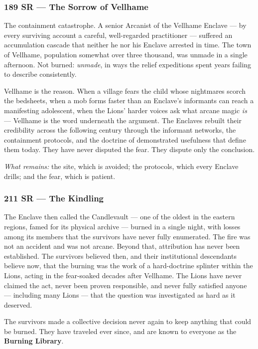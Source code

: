 \subsubsection{189 SR --- The Sorrow of Vellhame}

The containment catastrophe. A senior Arcanist of the Vellhame Enclave --- by every surviving account a careful, well-regarded practitioner --- suffered an accumulation cascade that neither he nor his Enclave arrested in time. The town of Vellhame, population somewhat over three thousand, was unmade in a single afternoon. Not burned: \textit{unmade}, in ways the relief expeditions spent years failing to describe consistently.

Vellhame is the reason. When a village fears the child whose nightmares scorch the bedsheets, when a mob forms faster than an Enclave's informants can reach a manifesting adolescent, when the Lions' harder voices ask what arcane magic \textit{is} --- Vellhame is the word underneath the argument. The Enclaves rebuilt their credibility across the following century through the informant networks, the containment protocols, and the doctrine of demonstrated usefulness that define them today. They have never disputed the fear. They dispute only the conclusion.

\textit{What remains:} the site, which is avoided; the protocols, which every Enclave drills; and the fear, which is patient.

\subsubsection{211 SR --- The Kindling}

The Enclave then called the Candlevault --- one of the oldest in the eastern regions, famed for its physical archive --- burned in a single night, with losses among its members that the survivors have never fully enumerated. The fire was not an accident and was not arcane. Beyond that, attribution has never been established. The survivors believed then, and their institutional descendants believe now, that the burning was the work of a hard-doctrine splinter within the Lions, acting in the fear-soaked decades after Vellhame. The Lions have never claimed the act, never been proven responsible, and never fully satisfied anyone --- including many Lions --- that the question was investigated as hard as it deserved.

The survivors made a collective decision never again to keep anything that could be burned. They have traveled ever since, and are known to everyone as the \textbf{Burning Library}.

